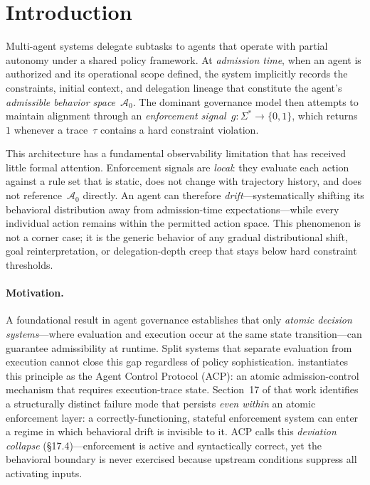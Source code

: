 \documentclass[11pt]{article}
\newcommand{\Sigstar}{\Sigma^{*}}
\newcommand{\Azero}{\mathcal{A}_0}
\begin{document}
\tableofcontents
\newpage

\section{Introduction}
\label{sec:intro}

Multi-agent systems delegate subtasks to agents that operate with partial
autonomy under a shared policy framework.  At \emph{admission time}, when an
agent is authorized and its operational scope defined, the system implicitly
records the constraints, initial context, and delegation lineage that
constitute the agent's \emph{admissible behavior space}~$\Azero$.  The
dominant governance model then attempts to maintain alignment through an
\emph{enforcement signal}~$g : \Sigstar \to \{0,1\}$, which returns~$1$
whenever a trace~$\tau$ contains a hard constraint violation.

This architecture has a fundamental observability limitation that has received
little formal attention.  Enforcement signals are \emph{local}: they evaluate
each action against a rule set that is static, does not change with trajectory
history, and does not reference~$\Azero$ directly.  An agent can therefore
\emph{drift}---systematically shifting its behavioral distribution away from
admission-time expectations---while every individual action remains within the
permitted action space.  This phenomenon is not a corner case; it is the
generic behavior of any gradual distributional shift, goal reinterpretation,
or delegation-depth creep that stays below hard constraint thresholds.

\paragraph{Motivation.}
A foundational result in agent governance \citep{fernandez2026a} establishes
that only \emph{atomic decision systems}---where evaluation and execution
occur at the same state transition---can guarantee admissibility at runtime.  Split systems that separate evaluation from
execution cannot close this gap regardless of policy sophistication.
\citet{fernandez2026acp} instantiates this principle as the Agent Control
Protocol (ACP): an atomic admission-control mechanism that requires
execution-trace state.  Section~17 of that work identifies a structurally
distinct failure mode that persists \emph{even within} an atomic enforcement
layer: a correctly-functioning, stateful enforcement system can enter a regime
in which behavioral drift is invisible to it.
ACP calls this \emph{deviation collapse} (\S17.4)---enforcement is active and
syntactically correct, yet the behavioral boundary is never exercised because
upstream conditions suppress all activating inputs.
\end{document}
